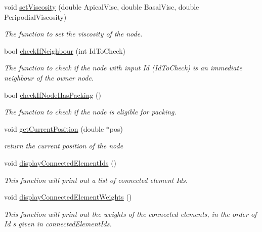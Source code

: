 \begin{DoxyCompactItemize}
\item 
void \hyperlink{classNode_a67cfbbe5179590b5deddf7d4086bc316}{set\+Viscosity} (double Apical\+Visc, double Basal\+Visc, double Peripodial\+Viscosity)
\begin{DoxyCompactList}\small\item\em The function to set the viscosity of the node. \end{DoxyCompactList}\item 
bool \hyperlink{classNode_a7dc5a9838a0a1963e58f648c5f7cb635}{check\+If\+Neighbour} (int Id\+To\+Check)
\begin{DoxyCompactList}\small\item\em The function to check if the node with input Id (Id\+To\+Check) is an immediate neighbour of the owner node. \end{DoxyCompactList}\item 
bool \hyperlink{classNode_a1d80e6f467d8ca919872b6e47a882dd5}{check\+If\+Node\+Has\+Packing} ()
\begin{DoxyCompactList}\small\item\em The function to check if the node is eligible for packing. \end{DoxyCompactList}\item 
void \hyperlink{classNode_ae4a2d9e601432a998efe24e1ac4a86cd}{get\+Current\+Position} (double $\ast$pos)
\begin{DoxyCompactList}\small\item\em return the current position of the node \end{DoxyCompactList}\item 
void \hyperlink{classNode_a3030a518aa97bd50060b8733e87540f7}{display\+Connected\+Element\+Ids} ()
\begin{DoxyCompactList}\small\item\em This function will print out a list of connected element Id\textquotesingle{}s. \end{DoxyCompactList}\item 
void \hyperlink{classNode_a755e8c3d76e7f1f0ab364fc3d4da3a9a}{display\+Connected\+Element\+Weights} ()
\begin{DoxyCompactList}\small\item\em This function will print out the weights of the connected elements, in the order of Id s given in connected\+Element\+Ids. \end{DoxyCompactList}\end{DoxyCompactItemize}
